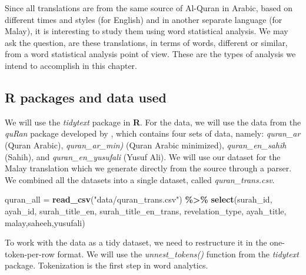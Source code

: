 \documentclass[
]{article}
\newenvironment{Shaded}{\begin{snugshade}}{\end{snugshade}}
\newcommand{\FunctionTok}[1]{\textcolor[rgb]{0.13,0.29,0.53}{\textbf{#1}}}
\newcommand{\NormalTok}[1]{#1}
\newcommand{\OtherTok}[1]{\textcolor[rgb]{0.56,0.35,0.01}{#1}}
\newcommand{\SpecialCharTok}[1]{\textcolor[rgb]{0.81,0.36,0.00}{\textbf{#1}}}
\newcommand{\StringTok}[1]{\textcolor[rgb]{0.31,0.60,0.02}{#1}}
\begin{document}
Since all translations are from the same source of Al-Quran in Arabic, based on different times and styles (for English) and in another separate language (for Malay), it is interesting to study them using word statistical analysis. We may ask the question, are these translations, in terms of words, different or similar, from a word statistical analysis point of view. These are the types of analysis we intend to accomplish in this chapter.

\hypertarget{R-packages-and-data-used}{%
\subsection{R packages and data used}\label{R-packages-and-data-used}}

We will use the \emph{tidytext} package in \textbf{R}. For the data, we will use the data from the \emph{quRan} package developed by \citep{quRan}, which contains four sets of data, namely: \emph{quran\_ar} (Quran Arabic), \emph{quran\_ar\_min)} (Quran Arabic minimized), \emph{quran\_en\_sahih} (Sahih), and \emph{quran\_en\_yusufali} (Yusuf Ali). We will use our dataset for the Malay translation which we generate directly from the source through a parser. We combined all the datasets into a single dataset, called \emph{quran\_trans.csv}.

\footnotesize

\begin{Shaded}
\begin{Highlighting}[]
\NormalTok{quran\_all }\OtherTok{=} \FunctionTok{read\_csv}\NormalTok{(}\StringTok{"data/quran\_trans.csv"}\NormalTok{) }\SpecialCharTok{\%\textgreater{}\%} 
              \FunctionTok{select}\NormalTok{(surah\_id, ayah\_id, surah\_title\_en, }
\NormalTok{                     surah\_title\_en\_trans, revelation\_type,}
\NormalTok{                     ayah\_title,}
\NormalTok{                     malay,saheeh,yusufali)}
\end{Highlighting}
\end{Shaded}

\normalsize

To work with the data as a tidy dataset, we need to restructure it in the one-token-per-row format. We will use the \emph{unnest\_tokens()} function from the \emph{tidytext} package. Tokenization is the first step in word analytics.

\footnotesize
\end{document}

